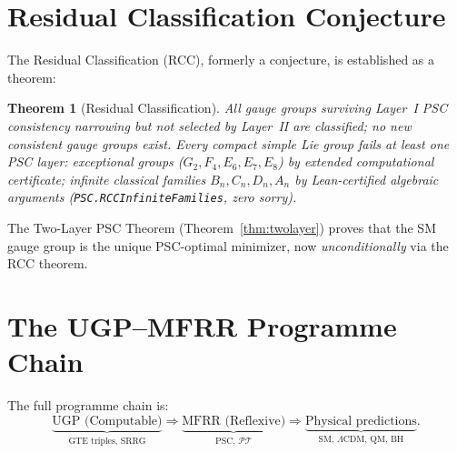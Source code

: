 \documentclass[11pt]{article}
\newcommand{\PT}{\mathcal{P}\mathcal{T}}
\theoremstyle{plain}
\newtheorem{theorem}{Theorem}[section]
\theoremstyle{definition}
\theoremstyle{remark}
\begin{document}
\section{Residual Classification Conjecture}
\label{sec:rcc}

The Residual Classification (RCC), formerly a conjecture, is established as a theorem:

\begin{theorem}[Residual Classification]
All gauge groups surviving Layer~I PSC consistency narrowing but not selected by Layer~II
are classified; no new consistent gauge groups exist.  Every compact simple Lie group
fails at least one PSC layer: exceptional groups ($G_2, F_4, E_6, E_7, E_8$) by
extended computational certificate; infinite classical families $B_n, C_n, D_n, A_n$
by Lean-certified algebraic arguments (\texttt{PSC.RCCInfiniteFamilies}, zero sorry).
\end{theorem}

\noindent The Two-Layer PSC Theorem (Theorem~\ref{thm:twolayer}) proves that the SM gauge group
is the unique PSC-optimal minimizer, now \emph{unconditionally} via the RCC theorem.

\section{The UGP--MFRR Programme Chain}
\label{sec:chain}

The full programme chain is:
\[
\underbrace{\text{UGP (Computable)}}_{\text{GTE triples, SRRG}} \Rightarrow
\underbrace{\text{MFRR (Reflexive)}}_{\text{PSC, $\PT$}} \Rightarrow
\underbrace{\text{Physical predictions}}_{\text{SM, $\Lambda$CDM, QM, BH}}.
\]
\end{document}
